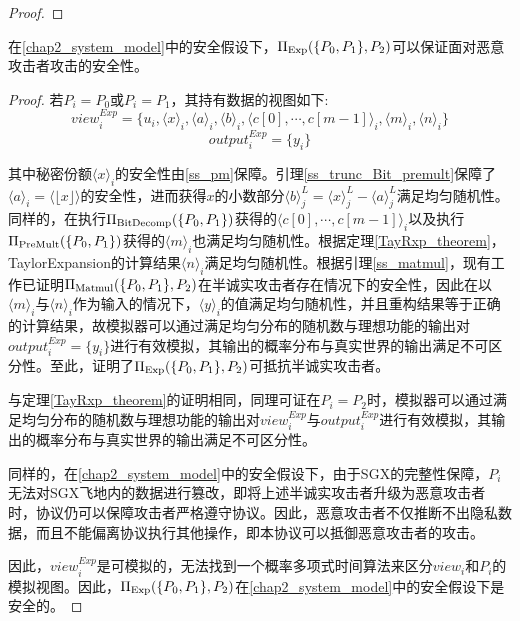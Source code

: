 \begin{proof}
%	
%	
%	
\end{proof}

\begin{theorem}
	\label{Exp_theorem}
	在\ref{chap2_system_model}中的安全假设下，$\Pi_{\rm Exp}(\{P_0, P_1\}, P_2)$可以保证面对恶意攻击者攻击的安全性。
\end{theorem}

\begin{proof}
	若$P_i=P_0$或$P_i=P_1$，其持有数据的视图如下:
	$$view_i^{Exp}=\{u_i, \langle x\rangle_i,\langle a\rangle_i, \langle b\rangle_i, \langle c[0],\cdots, c[m-1]\rangle_i,\langle m\rangle_i,\langle n\rangle_i\}$$
	$$output_i^{Exp}=\{y_i\}$$
	
	其中秘密份额$\langle x\rangle_i$的安全性由\ref{ss_pm}保障。引理\ref{ss_trunc_Bit_premult}保障了$\langle a\rangle_i=\langle \lfloor x \rfloor \rangle$的安全性，进而获得$x$的小数部分$\langle b\rangle_j^L = \langle x\rangle_j^L - \langle a\rangle_j^L$满足均匀随机性。同样的，在执行$\Pi_{\rm BitDecomp}(\{P_0, P_1\})$获得的$\langle c[0],\cdots, c[m-1]\rangle_i$以及执行$\Pi_{\rm PreMult}(\{P_0, P_1\})$获得的$\langle m\rangle_i$也满足均匀随机性。根据定理\ref{TayRxp_theorem}，TaylorExpansion的计算结果$\langle n\rangle_i$满足均匀随机性。根据引理\ref{ss_matmul}，现有工作已证明$\Pi_{\rm Matmul}(\{P_0, P_1\}, P_2)$在半诚实攻击者存在情况下的安全性，因此在以$\langle m\rangle_i$与$\langle n\rangle_i$作为输入的情况下，$\langle y\rangle_i$的值满足均匀随机性，并且重构结果等于正确的计算结果，故模拟器可以通过满足均匀分布的随机数与理想功能的输出对$output_i^{Exp}=\{y_i\}$进行有效模拟，其输出的概率分布与真实世界的输出满足不可区分性。至此，证明了$\Pi_{\rm Exp}(\{P_0, P_1\}, P_2)$可抵抗半诚实攻击者。
	
	与定理\ref{TayRxp_theorem}的证明相同，同理可证在$P_i=P_2$时，模拟器可以通过满足均匀分布的随机数与理想功能的输出对$view_i^{Exp}$与$output_i^{Exp}$进行有效模拟，其输出的概率分布与真实世界的输出满足不可区分性。
	
	同样的，在\ref{chap2_system_model}中的安全假设下，由于SGX的完整性保障\cite{SGX_Explained}，$P_i$无法对SGX飞地内的数据进行篡改，即将上述半诚实攻击者升级为恶意攻击者时，协议仍可以保障攻击者严格遵守协议。因此，恶意攻击者不仅推断不出隐私数据，而且不能偏离协议执行其他操作，即本协议可以抵御恶意攻击者的攻击。
	
	因此，$view_i^{Exp}$是可模拟的，无法找到一个概率多项式时间算法来区分$view_i$和$P_i$的模拟视图。因此，$\Pi_{\rm Exp}(\{P_0, P_1\}, P_2)$在\ref{chap2_system_model}中的安全假设下是安全的。
	
\end{proof}



